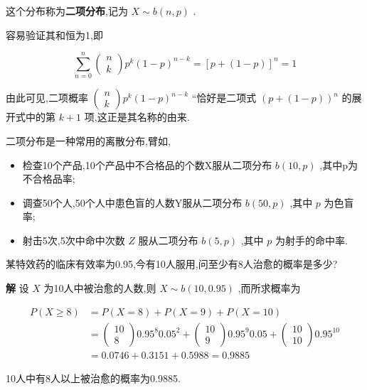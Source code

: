 这个分布称为\textbf{二项分布},记为 $ X \sim b(n, p) $ .

容易验证其和恒为1,即

\[
\sum_{n=0}^{n} \left( \begin{array}{l}{n} \\ {k}\end{array}\right) p^{k}(1-p)^{n-k}=[p+(1-p)]^{n}=1
\]

由此可见,二项概率 $ \left( \begin{array}{l}{n} \\ {k}\end{array}\right) p^{k}(1-p)^{n-k} $ ``恰好是二项式 $ (p+(1-p))^{n} $ 的展开式中的第 $ k+1 $ 项,这正是其名称的由来.

二项分布是一种常用的离散分布,臂如,

\begin{itemize}
	\item 检查10个产品,10个产品中不合格品的个数X服从二项分布 $ b(10,p) $ ,其中p为不合格品率;
	\item 调查50个人,50个人中患色盲的人数Y服从二项分布 $ b(50,p) $ ,其中 $ p $ 为色盲率;
	\item 射击5次,5次中命中次数 $ Z $ 服从二项分布 $ b(5,p) $ ,其中 $ p $ 为射手的命中率.
\end{itemize}

\begin{example}\label{exam:2.4.1}
	某特效药的临床有效率为0.95,今有10人服用,问至少有8人治愈的概率是多少?
	
	\textbf{解} 设 $ X $ 为10人中被治愈的人数,则 $ X \sim b(10,0.95) $ ,而所求概率为
	
	\[
	\begin{aligned} P(X \geqslant 8) &=P(X=8)+P(X=9)+P(X=10) \\ &=\left( \begin{array}{c}{10} \\ {8}\end{array}\right) 0.95^{8} 0.05^{2}+\left( \begin{array}{c}{10} \\ {9}\end{array}\right) 0.95^{9} 0.05+\left( \begin{array}{c}{10} \\ {10}\end{array}\right) 0.95^{10} \\ &=0.0746+0.3151+0.5988=0.9885 \end{aligned}
	\]
	
	10人中有8人以上被治愈的概率为0.9885.
	
\end{example}

